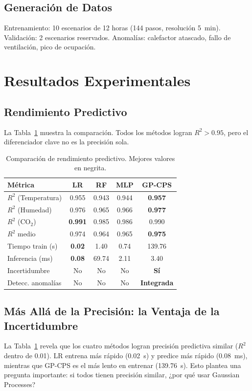 \documentclass[conference]{IEEEtran}
\begin{document}
\subsection{Generación de Datos}
Entrenamiento: 10 escenarios de 12 horas (144 pasos, resolución 5~min). Validación: 2 escenarios reservados. Anomalías: calefactor atascado, fallo de ventilación, pico de ocupación.

\section{Resultados Experimentales}
\label{sec:resultados}

\subsection{Rendimiento Predictivo}
La Tabla~\ref{tab:metrics} muestra la comparación. Todos los métodos logran $R^2 > 0.95$, pero el diferenciador clave no es la precisión sola.

\begin{table}[t]
\centering
\caption{Comparación de rendimiento predictivo. Mejores valores en negrita.}
\label{tab:metrics}
\small
\begin{tabular}{lcccc}
\toprule
\textbf{Métrica} & \textbf{LR} & \textbf{RF} & \textbf{MLP} & \textbf{GP-CPS} \\
\midrule
$R^2$ (Temperatura) & 0.955 & 0.943 & 0.944 & \textbf{0.957} \\
$R^2$ (Humedad) & 0.976 & 0.965 & 0.966 & \textbf{0.977} \\
$R^2$ (CO$_2$) & \textbf{0.991} & 0.985 & 0.986 & 0.990 \\
$R^2$ medio & 0.974 & 0.964 & 0.965 & \textbf{0.975} \\
\midrule
Tiempo train (s) & \textbf{0.02} & 1.40 & 0.74 & 139.76 \\
Inferencia (ms) & \textbf{0.08} & 69.74 & 2.11 & 3.40 \\
\midrule
Incertidumbre & No & No & No & \textbf{Sí} \\
Detecc. anomalías & No & No & No & \textbf{Integrada} \\
\bottomrule
\end{tabular}
\end{table}

\subsection{Más Allá de la Precisión: la Ventaja de la Incertidumbre}
La Tabla~\ref{tab:metrics} revela que los cuatro métodos logran precisión predictiva similar ($R^2$ dentro de 0.01). LR entrena más rápido (0.02~s) y predice más rápido (0.08~ms), mientras que GP-CPS es el más lento en entrenar (139.76~s). Esto plantea una pregunta importante: si todos tienen precisión similar, ¿por qué usar Gaussian Processes?
\end{document}
